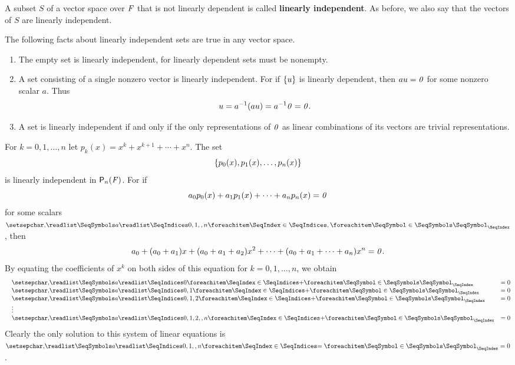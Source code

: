 \begin{defn}\label{1.5.3}
  A subset \(S\) of a vector space over \(\mathit{F}\) that is not linearly dependent is called \textbf{linearly independent}.
  As before, we also say that the vectors of \(S\) are linearly independent.
\end{defn}

\begin{eg}\label{1.5.4}
  The following facts about linearly independent sets are true in any vector space.
  \begin{enumerate}
    \item The empty set is linearly independent, for linearly dependent sets must be nonempty.
    \item A set consisting of a single nonzero vector is linearly independent.
          For if \(\left\lbrace u\right\rbrace\) is linearly dependent, then \(au = \mathit{0}\) for some nonzero scalar \(a\).
          Thus
          \[
            u = a^{-1} (au) = a^{-1} \mathit{0} = \mathit{0}.
          \]
    \item A set is linearly independent if and only if the only representations of \(\mathit{0}\) as linear combinations of its vectors are trivial representations.
  \end{enumerate}
\end{eg}

\begin{eg}\label{1.5.5}
  For \(k = 0, 1, \dots, n\) let \(p_k(x) = x^k + x^{k + 1} + \cdots + x^n\).
  The set
  \[
    \left\lbrace p_0(x), p_1(x), \dots, p_n(x)\right\rbrace
  \]
  is linearly independent in \(\ps[n]{\F}\).
  For if
  \[
    a_0 p_0(x) + a_1 p_1(x) + \cdots + a_n p_n(x) = \mathit{0}
  \]
  for some scalars \(\seq{a}{0,1,,n}\), then
  \[
    a_0 + (a_0 + a_1) x + (a_0 + a_1 + a_2) x^2 + \cdots + (a_0 + a_1 + \cdots + a_n) x^n = \mathit{0}.
  \]
  By equating the coefficients of \(x^k\) on both sides of this equation for \(k = 0, 1, \dots, n\), we obtain
  \[
    \begin{matrix*}[l]
      & \seq[+]{a}{0}      & = 0 \\
      & \seq[+]{a}{0,1}    & = 0 \\
      & \seq[+]{a}{0,1,2}  & = 0 \\
      & \vdots & \\
      & \seq[+]{a}{0,1,2,,n} & = 0
    \end{matrix*}
  \]
  Clearly the only solution to this system of linear equations is \(\seq[=]{a}{0,1,,n} = 0\).
\end{eg}
